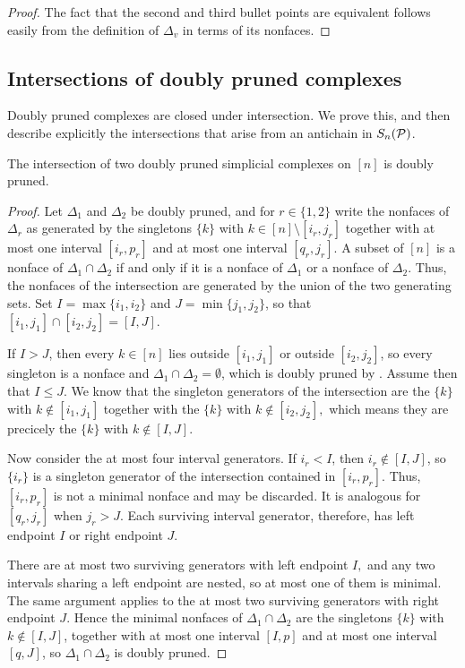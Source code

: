 \begin{proof}
    The fact that the second and third bullet points are equivalent follows easily from the definition of $\Delta_v$ in terms of its nonfaces.
\end{proof}

\subsection{Intersections of doubly pruned complexes}
Doubly pruned complexes are closed under intersection. We prove this, and then
describe explicitly the intersections that arise from an antichain in $S_n(\mathcal{P})$.
\begin{proposition}
\label{prop:intersection is doubly pruned}
    The intersection of two doubly pruned simplicial complexes on $[n]$ is doubly pruned.
\end{proposition}
\begin{proof}
    Let $\Delta_1$ and $\Delta_2$ be doubly pruned, and for $r\in\{1,2\}$ write the nonfaces of $\Delta_r$ as generated by the singletons $\{k\}$ with $k\in[n]\setminus[i_r,j_r]$ together with at most one interval $[i_r,p_r]$ and at most one interval $[q_r,j_r]$. 
    A subset of $[n]$ is a nonface of $\Delta_1\cap\Delta_2$ if and only if it is a nonface of $\Delta_1$ or a nonface of $\Delta_2.$ Thus, the nonfaces of the intersection are generated by the union of the two generating sets. 
    Set $I = \max\{i_1,i_2\}$ and $J = \min\{j_1,j_2\}$, so that $[i_1,j_1]\cap[i_2,j_2] = [I,J]$.

    If $I>J$, then every $k\in[n]$ lies outside $[i_1,j_1]$ or outside $[i_2,j_2]$, so every singleton is a nonface and $\Delta_1\cap\Delta_2 = \emptyset$, which is doubly pruned by . Assume then that $I\leq J$. We know that the singleton generators of the intersection are the $\{k\}$ with $k\not\in[i_1,j_1]$ together with the $\{k\}$ with $k\notin[i_2,j_2],$ which means they are precicely the $\{k\}$ with $k\notin[I,J]$.

    Now consider the at most four interval generators.
    If $i_r<I$, then $i_r\not\in[I,J]$, so $\{i_r\}$ is a singleton generator of the intersection contained in $[i_r,p_r]$. Thus, $[i_r,p_r]$ is not a minimal nonface and may be discarded. It is analogous for $[q_r,j_r]$ when $j_r>J$. Each surviving interval generator, therefore, has left endpoint $I$ or right endpoint $J$.

    There are at most two surviving generators with left endpoint $I,$ and any two intervals sharing a left endpoint are nested, so at most one of them is minimal.
    The same argument applies to the at most two surviving generators with right endpoint $J$. Hence the minimal nonfaces of $\Delta_1\cap\Delta_2$ are the singletons $\{k\}$ with $k\notin[I,J]$, together with at most one interval $[I,p]$ and at most one interval $[q,J]$, so $\Delta_1\cap\Delta_2$ is doubly
    pruned.
\end{proof}


